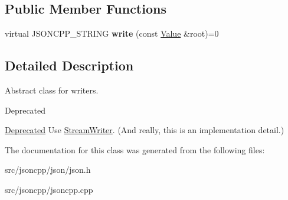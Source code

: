 \subsection*{Public Member Functions}
\begin{DoxyCompactItemize}
\item 
virtual J\+S\+O\+N\+C\+P\+P\+\_\+\+S\+T\+R\+I\+NG {\bfseries write} (const \hyperlink{classJson_1_1Value}{Value} \&root)=0\hypertarget{classJson_1_1Writer_a61c55882b82c7651d0b9b683c6d3f371}{}\label{classJson_1_1Writer_a61c55882b82c7651d0b9b683c6d3f371}

\end{DoxyCompactItemize}


\subsection{Detailed Description}
Abstract class for writers. 

\begin{DoxyRefDesc}{Deprecated}
\item[\hyperlink{deprecated__deprecated000007}{Deprecated}]Use \hyperlink{classJson_1_1StreamWriter}{Stream\+Writer}. (And really, this is an implementation detail.) \end{DoxyRefDesc}


The documentation for this class was generated from the following files\+:\begin{DoxyCompactItemize}
\item 
src/jsoncpp/json/json.\+h\item 
src/jsoncpp/jsoncpp.\+cpp\end{DoxyCompactItemize}
